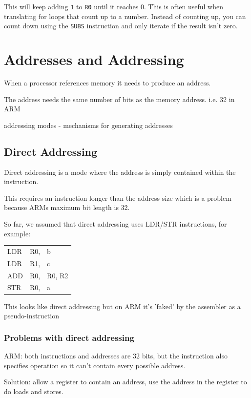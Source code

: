 \documentclass{article}
\begin{document}
This will keep adding {\tt 1} to {\tt R0} until it reaches 0. This is often
useful when translating for loops that count up to a number. Instead of counting
up, you can count down using the {\tt SUBS} instruction and only iterate if the
result isn't zero.

\section{Addresses and Addressing}
When a processor references memory it needs to produce an address.

The address needs the same number of bits as the memory address. i.e. 32 in ARM

addressing modes - mechanisms for generating addresses

\subsection{Direct Addressing}
Direct addressing is a mode where the address is simply contained within the instruction.

This requires an instruction longer than the address size which is a problem because ARMs maximum bit length is 32.

So far, we assumed that direct addressing uses LDR/STR instructions, for example:

\begin{center}
    \begin{tabular}{l l l}
        LDR & R0, & b\\
        LDR & R1, & c\\
        ADD & R0, & R0, R2\\
        STR & R0, & a \\
    \end{tabular}
\end{center}

This looks like direct addressing but on ARM it's 'faked' by the assembler as a pseudo-instruction

\subsubsection{Problems with direct addressing}
ARM: both instructions and addresses are 32 bits, but the instruction also specifies operation so it can't contain every possible address.

Solution: allow a register to contain an address, use the address in the register to do loads and stores.
\end{document}
